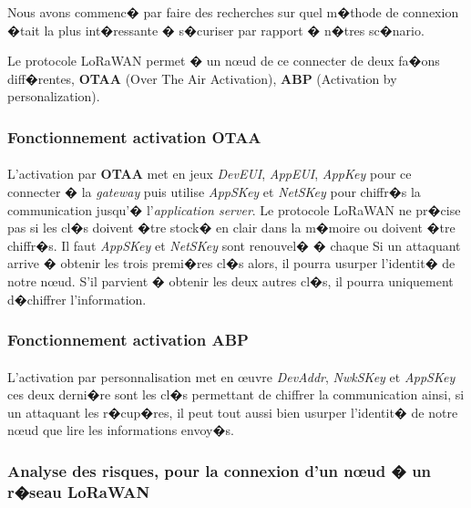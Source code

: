 \documentclass[a4paper, titlepage,12pt]{report}
\begin{document}
Nous avons commenc� par faire des recherches sur quel m�thode de connexion �tait la plus int�ressante � s�curiser par rapport � n�tres sc�nario. 

Le protocole LoRaWAN permet � un n\oe{}ud de ce connecter de deux fa�ons diff�rentes, \textbf{OTAA} (Over The Air Activation), \textbf{ABP} (Activation by personalization). 

\subsubsection{Fonctionnement activation OTAA}
\paragraph{}
L'activation par \textbf{OTAA} met en jeux \textit{DevEUI}, \textit{AppEUI}, \textit{AppKey}  pour ce connecter � la \textit{gateway} puis utilise \textit{AppSKey} et \textit{NetSKey} pour chiffr�s la communication jusqu'� l'\textit{application server}.
Le protocole LoRaWAN ne pr�cise pas si les cl�s doivent �tre stock� en clair dans la m�moire ou doivent �tre chiffr�s. Il faut \textit{AppSKey} et \textit{NetSKey} sont renouvel� � chaque 
Si un attaquant arrive � obtenir les trois premi�res cl�s alors, il pourra usurper l'identit� de notre n\oe{}ud. S'il parvient � obtenir les deux autres cl�s, il pourra uniquement d�chiffrer l'information.

\subsubsection{Fonctionnement activation ABP}
\paragraph{}
L'activation par personnalisation met en \oe{}uvre \textit{DevAddr}, \textit{NwkSKey} et \textit{AppSKey} ces deux derni�re sont les cl�s permettant de chiffrer la communication ainsi, si un attaquant les r�cup�res, il peut tout aussi bien usurper l'identit� de notre n\oe{}ud que lire les informations envoy�s.

\subsubsection{Analyse des risques, pour la connexion d'un n\oe{}ud � un r�seau LoRaWAN}
\paragraph{}
\end{document}

